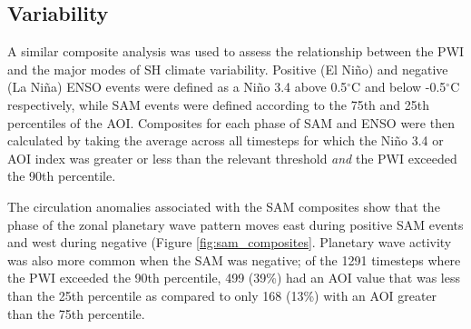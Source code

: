 \subsection{Variability}

A similar composite analysis was used to assess the relationship between the PWI and the major modes of SH climate variability. Positive (El Ni\~{n}o) and negative (La Ni\~{n}a) ENSO events were defined as a Ni\~{n}o 3.4 above 0.5$^{\circ}$C and below -0.5$^{\circ}$C respectively, while SAM events were defined according to the 75th and 25th percentiles of the AOI. Composites for each phase of SAM and ENSO were then calculated by taking the average across all timesteps for which the Ni\~{n}o 3.4 or AOI index was greater or less than the relevant threshold \textit{and} the PWI exceeded the 90th percentile. 

The circulation anomalies associated with the SAM composites show that the phase of the zonal planetary wave pattern moves east during positive SAM events and west during negative (Figure \ref{fig:sam_composites}. Planetary wave activity was also more common when the SAM was negative; of the 1291 timesteps where the PWI exceeded the 90th percentile, 499 (39\%) had an AOI value that was less than the 25th percentile as compared to only 168 (13\%) with an AOI greater than the 75th percentile.   